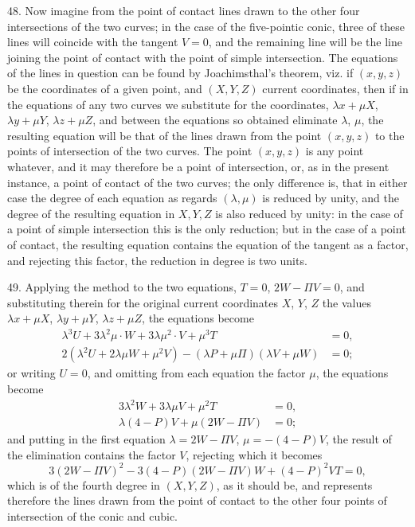 \documentclass[11pt,a4paper]{book}
\begin{document}
48. Now imagine from the point of contact lines drawn to the other four intersections of the two curves; in the case of the five-pointic conic, three of these lines will coincide with the tangent $V=0$, and the remaining line will be the line joining the point of contact with the point of simple intersection. The equations of the lines in question can be found by Joachimsthal's theorem, viz. if $(x,y,z)$ be the coordinates of a given point, and $(X,Y,Z)$ current coordinates, then if in the equations of any two curves we substitute for the coordinates, $\lambda x+\mu X$, $\lambda y+\mu Y$, $\lambda z+\mu Z$, and between the equations so obtained eliminate $\lambda$, $\mu$, the resulting equation will be that of the lines drawn from the point $(x,y,z)$ to the points of intersection of the two curves. The point $(x,y,z)$ is any point whatever, and it may therefore be a point of intersection, or, as in the present instance, a point of contact of the two curves; the only difference is, that in either case the degree of each equation as regards $(\lambda,\mu)$ is reduced by unity, and the degree of the resulting equation in $X,Y,Z$ is also reduced by unity: in the case of a point of simple intersection this is the only reduction; but in the case of a point of contact, the resulting equation contains the equation of the tangent as a factor, and rejecting this factor, the reduction in degree is two units.

49. Applying the method to the two equations, $T=0$, $2W-\Pi V=0$, and substituting therein for the original current coordinates $X$, $Y$, $Z$ the values $\lambda x+\mu X$, $\lambda y+\mu Y$, $\lambda z+\mu Z$, the equations become
\begin{align*}
\lambda^3U+3\lambda^2\mu\cdot W+3\lambda\mu^2\cdot V+\mu^3T &= 0,\\
2(\lambda^2U+2\lambda\mu W+\mu^2V)-(\lambda P+\mu\Pi)(\lambda V+\mu W) &= 0;
\end{align*}
or writing $U=0$, and omitting from each equation the factor $\mu$, the equations become
\begin{align*}
3\lambda^2W+3\lambda\mu V+\mu^2T &= 0,\\
\lambda(4-P)V+\mu(2W-\Pi V) &= 0;
\end{align*}
and putting in the first equation $\lambda=2W-\Pi V$, $\mu=-(4-P)V$, the result of the elimination contains the factor $V$, rejecting which it becomes
\[
3(2W-\Pi V)^2-3(4-P)(2W-\Pi V)W+(4-P)^2VT=0,
\]
which is of the fourth degree in $(X,Y,Z)$, as it should be, and represents therefore the lines drawn from the point of contact to the other four points of intersection of the conic and cubic.
\end{document}
